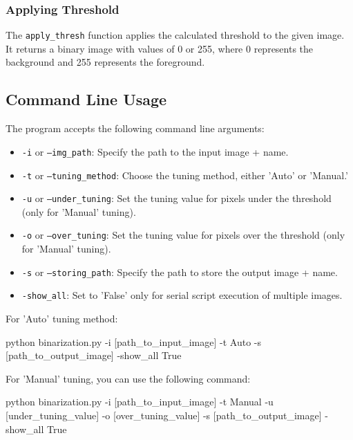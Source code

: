 \begin{multicols}{2}
\subsubsection{Applying Threshold}

The \texttt{apply\_thresh} function applies the calculated threshold to the given image. It returns a binary image with values of 0 or 255, where 0 represents the background and 255 represents the foreground.

\subsection{Command Line Usage}

The program accepts the following command line arguments:

\begin{itemize}
    \item \texttt{-i} or \texttt{--img\_path}: Specify the path to the input image + name.
    \item \texttt{-t} or \texttt{--tuning\_method}: Choose the tuning method, either 'Auto' or 'Manual.'
    \item \texttt{-u} or \texttt{--under\_tuning}: Set the tuning value for pixels under the threshold (only for 'Manual' tuning).
    \item \texttt{-o} or \texttt{--over\_tuning}: Set the tuning value for pixels over the threshold (only for 'Manual' tuning).
    \item \texttt{-s} or \texttt{--storing\_path}: Specify the path to store the output image + name.
    \item \texttt{-show\_all}: Set to 'False' only for serial script execution of multiple images.
\end{itemize}

\noindent
For 'Auto' tuning method:

\begin{bashscript}
    python binarization.py -i [path_to_input_image] -t Auto -s [path_to_output_image] -show_all True
\end{bashscript}

\noindent
For 'Manual' tuning, you can use the following command:

\begin{bashscript}
    python binarization.py -i [path_to_input_image] -t Manual -u [under_tuning_value] -o [over_tuning_value] -s [path_to_output_image] -show_all True
\end{bashscript}


\end{multicols}
